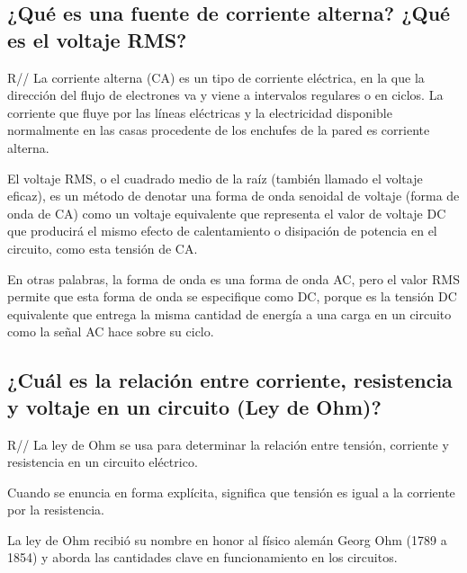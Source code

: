 \documentclass[letterpaper, 12pt]{report}
\begin{document}
\subsection{¿Qué es una fuente de corriente alterna? ¿Qué es el voltaje RMS?}

R// La corriente alterna (CA) es un tipo de corriente eléctrica, en
la que la dirección del flujo de electrones va y viene a intervalos
regulares o en ciclos. La corriente que fluye por las líneas eléctricas
y la electricidad disponible normalmente en las casas procedente de los
enchufes de la pared es corriente alterna.~\cite{CorrienteAlterna}

\vspace{.5cm}

El voltaje RMS, o el cuadrado medio de la raíz
(también llamado el voltaje eficaz), es un método de denotar una forma de
onda senoidal de voltaje (forma de onda de CA) como un voltaje equivalente
que representa el valor de voltaje DC que producirá el mismo efecto de
calentamiento o disipación de potencia en el circuito,
como esta tensión de CA.\@~\cite{VoltajeRMS}

\vspace{.5cm}

En otras palabras, la forma de onda es una forma de onda AC, pero el
valor RMS permite que esta forma de onda se especifique como DC, porque
es la tensión DC equivalente que entrega la misma cantidad de energía a
una carga en un circuito como la señal AC hace sobre
su ciclo.~\cite{VoltajeRMS}

\subsection{¿Cuál es la relación entre corriente, resistencia
	y voltaje en un circuito (Ley de Ohm)?}

R// La ley de Ohm se usa para determinar la relación entre tensión,
corriente y resistencia en un circuito eléctrico.~\cite{LeyDeOhm}

\vspace{.5cm}

Cuando se enuncia en forma explícita, significa que tensión es igual a la
corriente por la resistencia.~\cite{LeyDeOhm}

\vspace{.7cm}

La ley de Ohm recibió su nombre en honor al físico alemán Georg Ohm
(1789 a 1854) y aborda las cantidades clave en funcionamiento en
los circuitos.~\cite{LeyDeOhm}
\end{document}
